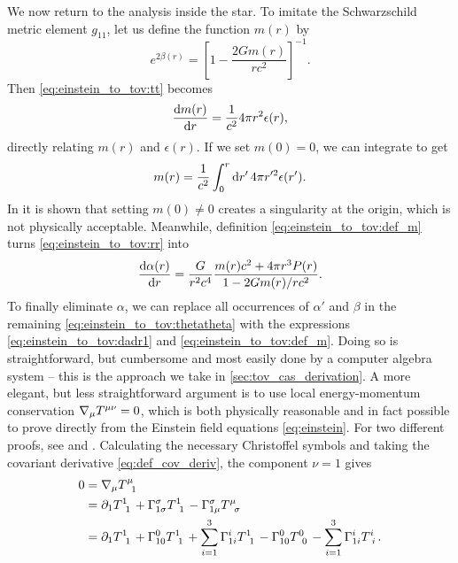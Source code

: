 We now return to the analysis inside the star.
To imitate the Schwarzschild metric element $g_{11}$, let us define the function $m(r)$ by
\begin{equation}
	e^{2 \beta(r)} = \left[ 1 - \frac{2 G m(r)}{r c^2} \right]^{-1} .
	\label{eq:einstein_to_tov:def_m}
\end{equation}
Then \cref{eq:einstein_to_tov:tt} becomes
\begin{equation}
	\odv{m(r)}{r} = \frac{1}{c^2} 4 \pi r^2 \epsilon(r) ,
	\label{eq:einstein_to_tov:m_rho}
\end{equation}
directly relating $m(r)$ and $\epsilon(r)$.
If we set $m(0) = 0$, we can integrate to get
\begin{equation}
	m(r) = \frac{1}{c^2} \integral{4 \pi r'^2 \epsilon(r')}{r'}{0}{r} .
	\label{eq:einstein_to_tov:m_integral}
\end{equation}
In \cite[page 602]{ref:mtw} it is shown that setting $m(0) \neq 0$ creates a singularity at the origin, which is not physically acceptable.
Meanwhile, definition \eqref{eq:einstein_to_tov:def_m} turns \cref{eq:einstein_to_tov:rr} into
\begin{equation}
	\odv{\alpha(r)}{r} = \frac{G}{r^2 c^4} \frac{m(r) c^2 + 4 \pi r^3 P(r)}{1 - 2 G m(r) / r c^2} .
	\label{eq:einstein_to_tov:dadr1}
\end{equation}
To finally eliminate $\alpha$, we can replace all occurrences of $\alpha'$ and $\beta$ in the remaining \cref{eq:einstein_to_tov:thetatheta} with the expressions \eqref{eq:einstein_to_tov:dadr1} and \eqref{eq:einstein_to_tov:def_m}.
Doing so is straightforward, but cumbersome and most easily done by a computer algebra system -- this is the approach we take in \cref{sec:tov_cas_derivation}.
A more elegant, but less straightforward argument is to use local energy-momentum conservation $\nabla_\mu T\indices{^\mu^\nu} = 0$, which is both physically reasonable and in fact possible to prove directly from the Einstein field equations \eqref{eq:einstein}.
For two different proofs, see \cite{ref:einstein_conservation_energy_momentum} and \cite[section 8.3.2]{ref:mika_gr_notes}.
Calculating the necessary Christoffel symbols and taking the covariant derivative \eqref{eq:def_cov_deriv}, the component $\nu=1$ gives
\begin{equation}
\begin{split}
	0 &= \nabla_\mu T\indices{^\mu_1} \\
	  &= \partial_1 T\indices{^1_1} + \Gamma^\sigma_{1 \sigma} T\indices{^1_1} - \Gamma^\sigma_{1 \mu} T\indices{^\mu_\sigma} \\
	  &= \partial_1 T\indices{^1_1} + \Gamma^0_{10} T\indices{^1_1} + \sum_{i=1}^3 \Gamma^i_{1i} T\indices{^1_1} - \Gamma^0_{10} T\indices{^0_0} - \sum_{i=1}^3 \Gamma^i_{1i} T\indices{^i_i} . \\
\end{split}
\end{equation}
